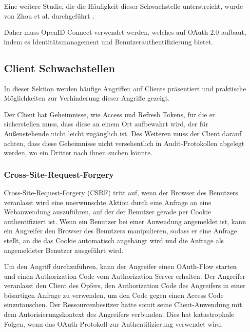 Eine weitere Studie, die die Häufigkeit dieser Schwachstelle unterstreicht, wurde von Zhou et al. durchgeführt \cite{SSEB_184435}.

Daher muss OpenID Connect verwendet werden, welches auf OAuth 2.0 aufbaut, indem es Identitätsmanagement und Benutzerauthentifizierung bietet.

\subsection{Client Schwachstellen}

In dieser Sektion werden häufige Angriffen auf Clients präsentiert und praktische Möglichkeiten zur Verhinderung dieser Angriffe gezeigt.

Der Client hat Geheimnisse, wie Access und Refresh Tokens, für die er sicherstellen muss, dass diese an einem Ort aufbewahrt wird, der für Außenstehende nicht leicht zugänglich ist. Des Weiteren muss der Client darauf achten, dass diese Geheimnisse nicht versehentlich in Audit-Protokollen abgelegt werden, wo ein Dritter nach ihnen suchen könnte.

\subsubsection{Cross-Site-Request-Forgery} \label{SSEB_Cross-Site-Request-Forgery}


Cross-Site-Request-Forgery (CSRF) tritt auf, wenn der Browser des Benutzers veranlasst wird eine unerwünschte Aktion durch eine Anfrage an eine Webanwendung auszuführen, auf der der Benutzer gerade per Cookie authentifiziert ist. Wenn ein Benutzer bei einer Anwendung angemeldet ist, kann ein Angreifer den Browser des Benutzers manipulieren, sodass er eine Anfrage stellt, an die das Cookie automatisch angehängt wird und die Anfrage als angemeldeter Benutzer ausgeführt wird. 

Um den Angriff durchzuführen, kann der Angreifer einen OAuth-Flow starten und einen Authorization Code vom Authorization Server erhalten. Der Angreifer veranlasst den Client des Opfers, den Authorization Code des Angreifers in einer bösartigen Anfrage zu verwenden, um den Code gegen einen Access Code einzutauschen. Der Ressourcenbesitzer hätte somit seine Client-Anwendung mit dem Autorisierungskontext des Angreifers verbunden. Dies hat katastrophale Folgen, wenn das OAuth-Protokoll zur Authentifizierung verwendet wird. \cite{SSEB_OAuth2inAction}


